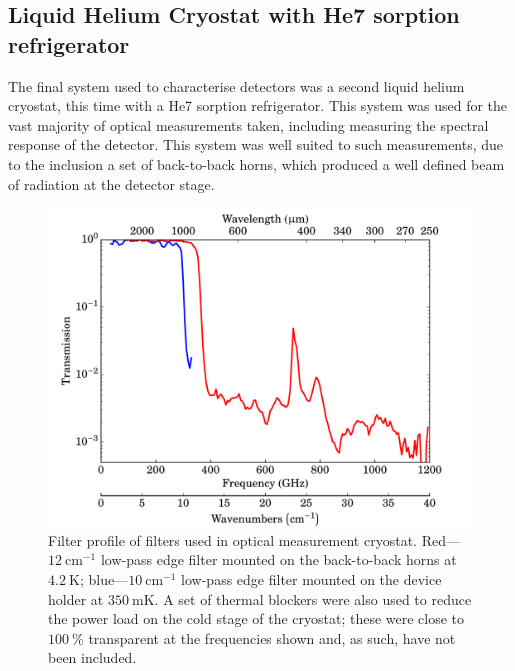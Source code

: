 \subsection{Liquid Helium Cryostat with He7 sorption refrigerator}
\label{ssec:CookieMonster}
The final system used to characterise detectors was a second liquid helium cryostat, this time with a He7 sorption refrigerator. This system was used for the vast majority of optical measurements taken, including measuring the spectral response of the detector. This system was well suited to such measurements, due to the inclusion a set of back-to-back horns, which produced a well defined beam of radiation at the detector stage.
\begin{figure}[tb]
\begin{center}
\includegraphics[width = 1.0\textwidth]{figures/CookieMonsterFilters}
\caption[Filter profile of filters used in the optical measurement cryostat]{Filter profile of filters used in optical measurement cryostat. Red---$12~\mathrm{cm}^{-1}$ low-pass edge filter mounted on the back-to-back horns at $4.2~\mathrm{K}$; blue---$10~\mathrm{cm}^{-1}$ low-pass edge filter mounted on the device holder at $350~\mathrm{mK}$. A set of thermal blockers were also used to reduce the power load on the cold stage of the cryostat; these were close to $100~\%$ transparent at the frequencies shown and, as such, have not been included.}
\label{fig:CookieMonsterFilters}
\end{center}
\end{figure}
\par 
